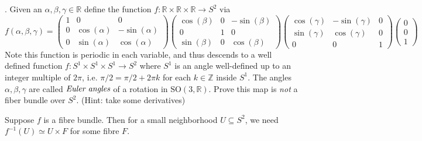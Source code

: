 \documentclass[12pt]{article}
\newcommand{\R}{\mathbb{R}}
\newcommand{\SO}{\text{SO}}
\newcommand{\lra}{\longrightarrow}
\begin{document}
.  Given an $\alpha,\beta,\gamma \in \R$ define the function $f: \R\times \R \times \R \lra S^{2}$ via 
\[
f(\alpha,\beta,\gamma) = \left(
\begin{array}{ccc}
1 & 0 & 0 \\
0 & \cos(\alpha) &-\sin(\alpha) \\
0 & \sin(\alpha) & \cos(\alpha)
\end{array}
\right)
\left(
\begin{array}{ccc}
\cos(\beta) & 0 & -\sin(\beta) \\
0 & 1&0  \\
\sin(\beta) & 0 & \cos(\beta)
\end{array}
\right)
\left(
\begin{array}{ccc}
\cos(\gamma) & -\sin(\gamma) & 0 \\
\sin(\gamma) & \cos(\gamma) &0 \\
0 & 0 & 1
\end{array}
\right)
\left(
\begin{array}{c}
0 \\
0 \\
1
\end{array}
\right)\]
Note this function is periodic in each variable, and thus descends to a well defined function $f: S^{1}\times S^{1} \times S^{1} \lra S^{2}$ where $S^{1}$ is an angle well-defined up to an integer multiple of $2\pi$, i.e. 
$\pi/2 = \pi/2 + 2\pi k$ for each $k \in \mathbb{Z}$ inside $S^{1}$.  The angles $\alpha,\beta,\gamma$ are called $\emph{Euler angles}$ of a rotation in $\SO(3,\R)$.  Prove this map is \emph{not} a fiber bundle over $S^{2}$.  (Hint: take some derivatives)

    \color{blue}
        Suppose $f$ is a fibre bundle. Then for a small neighborhood $U \subseteq S^2$, we need $f^{-1}(U) \simeq U \times F$ for some fibre $F$.
\end{document}
